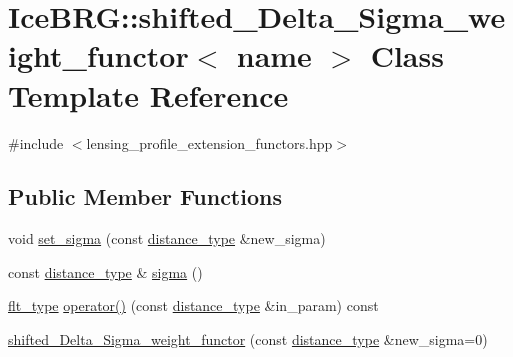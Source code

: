 \hypertarget{classIceBRG_1_1shifted__Delta__Sigma__weight__functor}{\section{Ice\-B\-R\-G\-:\-:shifted\-\_\-\-Delta\-\_\-\-Sigma\-\_\-weight\-\_\-functor$<$ name $>$ Class Template Reference}
\label{classIceBRG_1_1shifted__Delta__Sigma__weight__functor}
}


{\ttfamily \#include $<$lensing\-\_\-profile\-\_\-extension\-\_\-functors.\-hpp$>$}

\subsection*{Public Member Functions}
\begin{DoxyCompactItemize}
\item 
void \hyperlink{classIceBRG_1_1shifted__Delta__Sigma__weight__functor_a2026781ba59225ada097ebbfe0bd6a2e}{set\-\_\-sigma} (const \hyperlink{namespaceIceBRG_a45499647eb87e24c10ab32c628711cec}{distance\-\_\-type} \&new\-\_\-sigma)
\item 
const \hyperlink{namespaceIceBRG_a45499647eb87e24c10ab32c628711cec}{distance\-\_\-type} \& \hyperlink{classIceBRG_1_1shifted__Delta__Sigma__weight__functor_a5cfdb023c662a6a36eb71f48d145af20}{sigma} ()
\item 
\hyperlink{lib_2IceBRG__main_2common_8h_ad0f130a56eeb944d9ef2692ee881ecc4}{flt\-\_\-type} \hyperlink{classIceBRG_1_1shifted__Delta__Sigma__weight__functor_a94c86fb0144b5d0b8141432ead2ae033}{operator()} (const \hyperlink{namespaceIceBRG_a45499647eb87e24c10ab32c628711cec}{distance\-\_\-type} \&in\-\_\-param) const 
\item 
\hyperlink{classIceBRG_1_1shifted__Delta__Sigma__weight__functor_a51a1dc51c719c6e056d489b57807b8a8}{shifted\-\_\-\-Delta\-\_\-\-Sigma\-\_\-weight\-\_\-functor} (const \hyperlink{namespaceIceBRG_a45499647eb87e24c10ab32c628711cec}{distance\-\_\-type} \&new\-\_\-sigma=0)
\end{DoxyCompactItemize}


